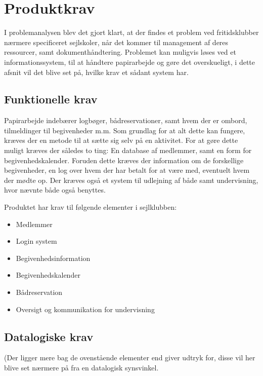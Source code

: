 \chapter{Produktkrav}

I problemanalysen blev det gjort klart, at der findes et problem ved fritidsklubber nærmere specificeret sejlskoler, når
det kommer til management af deres ressourcer, samt dokumenthåndtering. Problemet kan muligvis løses ved et
informationssystem, til at håndtere papirarbejde og gøre det overskueligt, i dette afsnit vil det
blive set på, hvilke krav et sådant system har.


\section{Funktionelle krav} \label{sec:funktionelleKrav}

Papirarbejde indebærer logbøger, bådreservationer, samt hvem der er ombord, tilmeldinger til
begivenheder m.m. Som grundlag for at alt dette kan fungere, kræves der en metode til at sætte sig selv på en
aktivitet. For at gøre dette muligt kræves der således to ting: En database af medlemmer, samt en form for
begivenhedskalender. Foruden dette kræves der information om de forskellige begivenheder, en log over hvem der
har betalt for at være med, eventuelt hvem der mødte op. Der kræves også et system til udlejning af både samt
undervisning, hvor nævnte både også benyttes.

Produktet har krav til følgende elementer i sejlklubben:
\begin{itemize}
  \item Medlemmer
  \item Login system
  \item Begivenhedsinformation
  \item Begivenhedskalender
  \item Bådreservation
  \item Oversigt og kommunikation for undervisning
\end{itemize}



\section{Datalogiske krav}

(Der ligger mere bag de ovenstående elementer end  giver udtryk for, disse vil her
blive set nærmere på fra en datalogisk synsvinkel.



